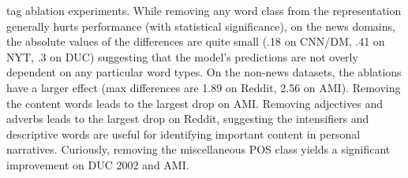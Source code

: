 tag ablation experiments. 
While removing any word class from the representation generally hurts %
performance (with statistical significance), on the news domains,
the absolute values of the differences are quite small 
(.18 on CNN/DM, .41 on NYT, .3 on DUC) suggesting that the model's predictions
are not overly dependent on any particular word types. 
On the non-news datasets, the ablations have a larger effect 
(max differences are 1.89 on Reddit, 2.56 on AMI). 
Removing the content words leads to the largest drop on AMI.
Removing adjectives and adverbs leads to the largest drop on Reddit,
suggesting the intensifiers and descriptive words are useful for 
identifying important content in personal narratives.
Curiously, 
removing the miscellaneous POS class yields a significant improvement
on DUC 2002 and AMI.




